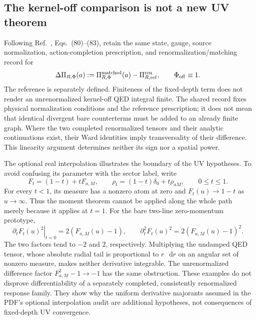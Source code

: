\documentclass[final,5p,times,twocolumn,numbers,nopreprintline]{elsarticle}
\numberwithin{equation}{section}
\theoremstyle{definition}
\theoremstyle{remark}
\newcommand{\dd}{\mathop{}\!\mathrm d}
\begin{document}
\subsection{The kernel-off comparison is not a new UV theorem}
\label{sec:OQED-reference}

Following Ref.~\cite{ChiapponeIgnition}, Eqs.~(80)--(83), retain the
same state, gauge, source normalization, action-completion prescription,
and renormalization/matching record for
\begin{equation}
 \Delta\Pi_{R,\Phi}(a)
       :=\Pi_{R,\Phi}^{\rm matched}(a)-\Pi_{R,\rm ref}^{\rm ren},
       \qquad \Phi_{\rm off}\equiv1.
\label{eq:OQED-matched-increment}
\end{equation}
The reference is separately defined. Finiteness of the fixed-depth
term does not render an unrenormalized kernel-off QED integral finite.
The shared record fixes physical normalization conditions and the
reference prescription; it does not mean that identical divergent bare
counterterms must be added to an already finite graph. Where the two
completed renormalized tensors and their analytic continuations exist,
their Ward identities imply transversality of their difference. This
linearity argument determines neither its sign nor a spatial power.

The optional real interpolation illustrates the boundary of the UV
hypotheses. To avoid confusing its parameter with the sector label,
write
\begin{equation}
 F_t=(1-t)+tF_{a,M},\qquad
 \rho_t=(1-t)\delta_0+t\rho_{aM},\qquad 0\leq t\leq1.
\label{eq:OQED-interpolation-atom}
\end{equation}
For every \(t<1\), its measure has a nonzero atom at zero and
\(F_t(u)\to1-t\) as \(u\to\infty\). Thus the moment theorem
cannot be applied along the whole path merely because it applies at
\(t=1\). For the bare two-line zero-momentum prototype,
\begin{equation}
 \left.\partial_tF_t(u)^2\right|_{t=0}=2(F_{a,M}(u)-1),\qquad
 \partial_t^2F_t(u)^2=2(F_{a,M}(u)-1)^2.
\label{eq:OQED-interpolation-derivatives}
\end{equation}
The two factors tend to \(-2\) and \(2\), respectively. Multiplying
the undamped QED tensor, whose absolute radial tail is proportional
to \(r\,\dd r\) on an angular set of nonzero measure, makes neither
derivative integrable. The unrenormalized difference factor
\(F_{a,M}^2-1\to-1\) has the same obstruction. These examples do
not disprove differentiability of a separately completed, consistently
renormalized response family. They show why the uniform derivative
majorants assumed in the PDF's optional interpolation audit are
additional hypotheses, not consequences of fixed-depth UV convergence.
\end{document}
